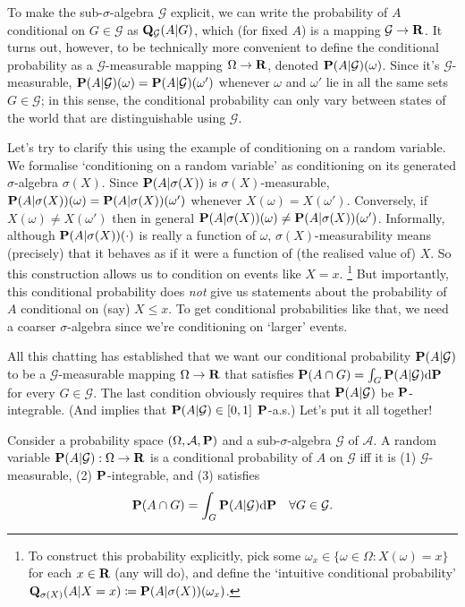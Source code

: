 \documentclass[11pt,letterpaper,reqno,oneside]{article}
\begin{document}
To make the sub-$\sigma$-algebra $\mathcal{G}$ explicit, we can write the probability of $A$ conditional on $G \in \mathcal{G}$ as $\mathbf{Q}_\mathcal{G}(A|G)$, which (for fixed $A$) is a mapping $\mathcal{G} \to \mathbf{R}$. It turns out, however, to be technically more convenient to define the conditional probability as a $\mathcal{G}$-measurable mapping $\Omega \to \mathbf{R}$, denoted $\mathbf{P}(A|\mathcal{G})(\omega)$. Since it's $\mathcal{G}$-measurable, $\mathbf{P}(A|\mathcal{G})(\omega)=\mathbf{P}(A|\mathcal{G})(\omega')$ whenever $\omega$ and $\omega'$ lie in all the same sets $G \in \mathcal{G}$; in this sense, the conditional probability can only vary between states of the world that are distinguishable using $\mathcal{G}$.


Let's try to clarify this using the example of conditioning on a random variable. We formalise `conditioning on a random variable' as conditioning on its generated $\sigma$-algebra $\sigma(X)$. Since $\mathbf{P}(A|\sigma(X))$ is $\sigma(X)$-measurable, $\mathbf{P}(A|\sigma(X))(\omega)=\mathbf{P}(A|\sigma(X))(\omega')$ whenever $X(\omega)=X(\omega')$. Conversely, if $X(\omega) \neq X(\omega')$ then in general $\mathbf{P}(A|\sigma(X))(\omega) \neq \mathbf{P}(A|\sigma(X))(\omega')$. Informally, although $\mathbf{P}(A|\sigma(X))(\cdot)$ is really a function of $\omega$, $\sigma(X)$-measurability means (precisely) that it behaves as if it were a function of (the realised value of) $X$. So this construction allows us to condition on events like $X=x$.%
	\footnote{To construct this probability explicitly, pick some $\omega_x \in \{ \omega \in \Omega : X(\omega)=x \}$ for each $x \in \mathbf{R}$ (any will do), and define the `intuitive conditional probability' $\mathbf{Q}_{\sigma(X)}(A|X=x) \coloneqq \mathbf{P}(A|\sigma(X))(\omega_x)$.}
But importantly, this conditional probability does \emph{not} give us statements about the probability of $A$ conditional on (say) $X \leq x$. To get conditional probabilities like that, we need a coarser $\sigma$-algebra since we're conditioning on `larger' events.


All this chatting has established that we want our conditional probability $\mathbf{P}(A|\mathcal{G})$ to be a $\mathcal{G}$-measurable mapping $\Omega \to \mathbf{R}$ that satisfies $\mathbf{P}(A \cap G) = \int_G \mathbf{P}(A|\mathcal{G}) \mathrm{d} \mathbf{P}$ for every $G \in \mathcal{G}$. The last condition obviously requires that $\mathbf{P}(A|\mathcal{G})$ be $\mathbf{P}$-integrable. (And implies that $\mathbf{P}(A|\mathcal{G}) \in [0,1]$ $\mathbf{P}$-a.s.) Let's put it all together!
%
\begin{definition}
	Consider a probability space $(\Omega,\mathcal{A},\mathbf{P})$ and a sub-$\sigma$-algebra $\mathcal{G}$ of $\mathcal{A}$. A random variable $\mathbf{P}(A|\mathcal{G}) : \Omega \to \mathbf{R}$ is a conditional probability of $A$ on $\mathcal{G}$ iff it is (1) $\mathcal{G}$-measurable, (2) $\mathbf{P}$-integrable, and (3) satisfies
	\begin{equation*}
		\mathbf{P}(A \cap G)
		= \int_G \mathbf{P}(A|\mathcal{G}) \mathrm{d} \mathbf{P} 
		\quad\forall G \in \mathcal{G} .
	\end{equation*}
\end{definition}
\end{document}
